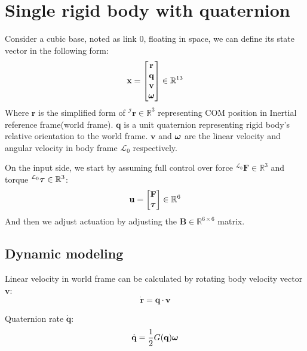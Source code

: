 \section{Single rigid body with quaternion}

Consider a cubic base, noted as link 0, floating in space, we can define its state vector in the following form:
\begin{equation}
    \textbf{x} = \begin{bmatrix}
        \textbf{r} \\  \textbf{q} \\ \textbf{v} \\ \text{\boldmath$\omega$}
    \end{bmatrix} \in \mathbb{R}^{13}
\end{equation}
Where $\textbf{r}$ is the simplified form of $^{\mathcal{I}}\textbf{r}\in \mathbb{R}^3$ representing COM position in Inertial reference frame(world frame). $\textbf{q}$ is a unit quaternion representing rigid body's relative orientation to the world frame. $\textbf{v}$ and $\text{\boldmath$\omega$}$ are the linear velocity and angular velocity in body frame $\mathcal{L}_0$  respectively.

On the input side, we start by assuming full control over force $^{\mathcal{L}_0}\textbf{F} \in \mathbb{R}^3$ and torque $^{\mathcal{L}_0}\text{\boldmath$\tau$} \in \mathbb{R}^3$:
\begin{equation}
    \textbf{u} = \begin{bmatrix}
        \textbf{F} \\ \text{\boldmath$\tau$}
    \end{bmatrix} \in \mathbb{R}^{6}
\end{equation}
And then we adjust actuation by adjusting the $\textbf{B} \in \mathbb{R}^{6 \times 6}$ matrix.
\subsection{Dynamic modeling}
Linear velocity in world frame can be calculated by rotating body velocity vector $\textbf{v}$:
\begin{equation}
    \dot{\textbf{r}} = \textbf{q} \cdot \textbf{v}
\end{equation}

Quaternion rate $\dot{\textbf{q}}$:
\begin{equation}
    \dot{\textbf{q}} = \frac{1}{2}G(\textbf{q})\text{\boldmath$\omega$}
\end{equation}

